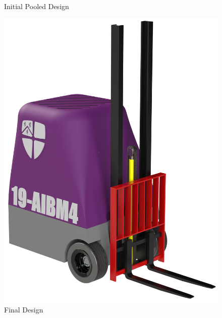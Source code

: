 \documentclass[12pt,titlepage]{article}
\begin{document}
\begin{figure}[ht]
\begin{minipage}[t]{0.22\textwidth}
        \captionsetup{width=0.8\textwidth}
        \caption{Initial Pooled Design}
        \label{fig:x}
    \end{minipage}
    \begin{minipage}[t]{0.22\textwidth}
        \vspace{-2pt} 
        \centering
        \includegraphics[width=\linewidth]{Initial Final (7) Cropped.png}  
        \captionsetup{width=0.7\textwidth}
        \caption{Final Design}
        \label{fig:x}
    \end{minipage}
\end{figure}
\FloatBarrier


\FloatBarrier
\end{document}

